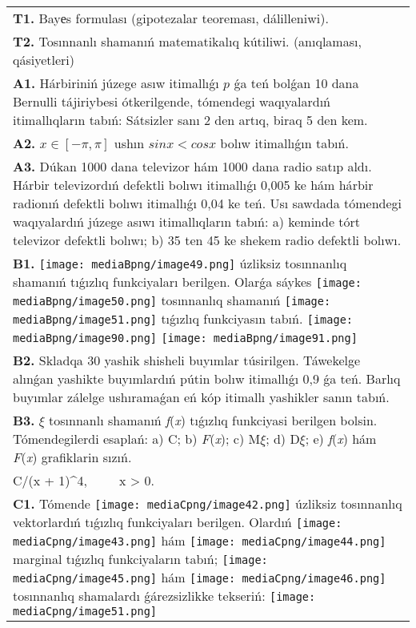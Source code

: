 \documentclass{article}
\begin{document}
\begin{tabular}{m{17cm}}
\textbf{T1.} Bayеs formulası (gipotezalar teoreması, dálilleniwi).
 \\
\textbf{T2.} Tosınnanlı shamanıń matematikalıq kútiliwi. (anıqlaması, qásiyetleri)
 \\
\textbf{A1.} Hárbiriniń júzege asıw itimallıǵı $p$ ǵa teń bolǵan 10 dana Bernulli tájiriybesi ótkerilgende, tómendegi waqıyalardıń itimallıqların tabıń: Sátsizler sanı 2 den artıq, biraq 5 den kem.
 \\
\textbf{A2.} $x\in \left[ -\pi ,\pi  \right]$ ushın $sinx<cosx$ bolıw itimallıǵın tabıń.
 \\
\textbf{A3.} Dúkan 1000 dana televizor hám 1000 dana radio satıp aldı. Hárbir televizordıń defektli bolıwı itimallıǵı 0,005 ke hám hárbir radionıń defektli bolıwı itimallıǵı 0,04 ke teń. Usı sawdada tómendegi waqıyalardıń júzege asıwı itimallıqların tabıń: a) keminde tórt televizor defektli bolıwı; b) 35 ten 45 ke shekem radio defektli bolıwı.
 \\
\textbf{B1.} \texttt{[image: mediaBpng/image49.png]} úzliksiz tosınnanlıq shamanıń tıǵızlıq funkciyaları berilgen. Olarǵa sáykes \texttt{[image: mediaBpng/image50.png]} tosınnanlıq shamanıń \texttt{[image: mediaBpng/image51.png]} tıǵızlıq funkciyasın tabıń. \texttt{[image: mediaBpng/image90.png]} \texttt{[image: mediaBpng/image91.png]}
 \\
\textbf{B2.} Skladqa 30 yashik shisheli buyımlar túsirilgen. Táwekelge alınǵan yashikte buyımlardıń pútin bolıw itimallıǵı 0,9 ǵa teń. Barlıq buyımlar zálelge ushıramaǵan eń kóp itimallı yashikler sanın tabıń.
 \\
\textbf{B3.} $\xi$ tosınnanlı shamanıń \emph{f}(\emph{x}) tıǵızlıq funkciyasi berilgen bolsin. Tómendegilerdi esaplań: a) C; b) \emph{F}(\emph{x}); c) M$\xi$; d) D$\xi$; e) \emph{f}(\emph{x}) hám \emph{F}(\emph{x}) grafiklarin sızıń.\(f(x) = \left\{ \begin{matrix}
\ \ \ \ \ \ \ \ 0,\ \ \ \ \ \ \ \ \ \ \ \ x \leq 0, \\
C/(x + 1)^{4},\ \ \ \ \ x > 0.\ \ 
\end{matrix} \right.\ \)
 \\
\textbf{C1.} Tómende \texttt{[image: mediaCpng/image42.png]} úzliksiz tosınnanlıq vektorlardıń tıǵızlıq funkciyaları berilgen. Olardıń \texttt{[image: mediaCpng/image43.png]} hám \texttt{[image: mediaCpng/image44.png]} marginal tıǵızlıq funkciyaların tabıń; \texttt{[image: mediaCpng/image45.png]} hám \texttt{[image: mediaCpng/image46.png]} tosınnanlıq shamalardı ǵárezsizlikke tekseriń: \texttt{[image: mediaCpng/image51.png]}

\end{tabular}
\end{document}
